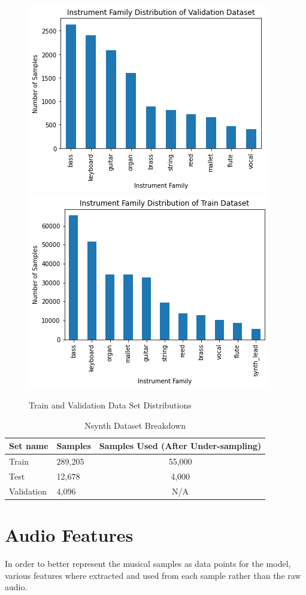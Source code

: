 \documentclass{article}
\begin{document}
\begin{figure}[htb]
  \centering
  \includegraphics[width=.35\linewidth]{validation_distribution}
  \includegraphics[width=.35\linewidth]{train_distribution}
  \caption{Train and Validation Data Set Distributions}
\end{figure}
\begin{table}[htb]
  \caption{Nsynth Dataset Breakdown}
  \label{Nsynth-Dataset}
  \centering
  \begin{tabular}{llc}
    \toprule
    Set name & Samples & Samples Used (After Under-sampling)\\
    \midrule
    Train & 289,205 & 55,000\\
    Test & 12,678 & 4,000\\
    Validation & 4,096 & N/A\\
    \bottomrule
  \end{tabular}
\end{table}


\section{Audio Features}
\label{features}

In order to better represent the musical samples as data points for the model, various features where extracted and used from each sample rather than the raw audio.
\end{document}
